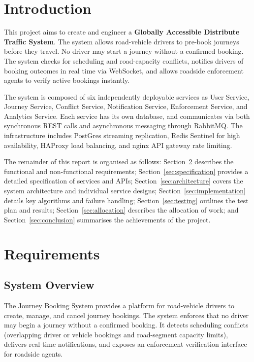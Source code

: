 \documentclass[12pt,a4paper]{article}
\begin{document}
\section{Introduction}

This project aims to create and engineer a \textbf{Globally Accessible Distribute Traffic System}. The system allows road-vehicle drivers to pre-book journeys before they travel. No driver may start a journey without a confirmed booking. The system checks for scheduling and road-capacity conflicts, notifies drivers of booking outcomes in real time via WebSocket, and allows roadside enforcement agents to verify active bookings instantly.
 
The system is composed of six independently deployable services as User Service, Journey Service, Conflict Service, Notification Service, Enforcement Service, and Analytics Service. Each service has its own database, and communicates via both synchronous REST calls and asynchronous messaging through RabbitMQ. The infrastructure includes PostGres streaming replication, Redis Sentinel for high availability, HAProxy load balancing, and nginx API gateway rate limiting.
 
The remainder of this report is organised as follows: Section~\ref{sec:requirements} describes the functional and non-functional requirements; Section~\ref{sec:specification} provides a detailed specification of services and APIs; Section~\ref{sec:architecture} covers the system architecture and individual service designs; Section~\ref{sec:implementation} details key algorithms and failure handling; Section~\ref{sec:testing} outlines the test plan and results; Section~\ref{sec:allocation} describes the allocation of work; and Section~\ref{sec:conclusion} summarises the achievements of the project.

\section{Requirements}
\label{sec:requirements}
 
\subsection{System Overview}
 
The Journey Booking System provides a platform for road-vehicle drivers to create, manage, and cancel journey bookings. The system enforces that no driver may begin a journey without a confirmed booking. It detects scheduling conflicts (overlapping driver or vehicle bookings and road-segment capacity limits), delivers real-time notifications, and exposes an enforcement verification interface for roadside agents.
 
\end{document}
